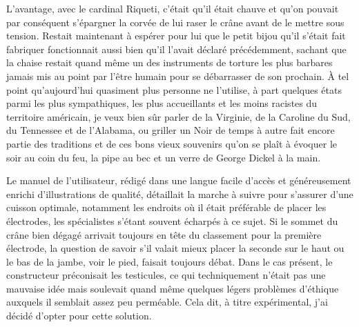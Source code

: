 L’avantage, avec le cardinal Riqueti, c’était qu’il était chauve et qu’on pouvait par conséquent s’épargner la corvée de lui raser le crâne avant de le mettre sous tension. Restait maintenant à espérer pour lui que le petit bijou qu’il s’était fait fabriquer fonctionnait aussi bien qu’il l’avait déclaré précédemment, sachant que la chaise restait quand même un des instruments de torture les plus barbares jamais mis au point par l’être humain pour se débarrasser de son prochain. À tel point qu’aujourd’hui quasiment plus personne ne l’utilise, à part quelques états parmi les plus %
%
%
sympathiques, les plus accueillants et les moins racistes du territoire américain, je veux bien sûr parler de la Virginie, de la Caroline du Sud, du Tennessee et de l’Alabama, ou griller un Noir de temps à autre fait encore partie des traditions et de ces bons vieux souvenirs qu’on se plaît à évoquer le soir au coin du feu, la pipe au bec et un verre de George Dickel à la main.

Le manuel de l’utilisateur, rédigé dans une langue facile d’accès et généreusement enrichi d’illustrations de qualité, détaillait la marche à suivre pour s’assurer d’une cuisson optimale, notamment les endroits où il était préférable de placer les électrodes, les spécialistes s’étant souvent écharpés à ce sujet. Si le sommet du crâne bien dégagé arrivait toujours en tête du classement pour la première électrode, la question de savoir s’il valait mieux placer la seconde sur le haut ou le bas de la jambe, voir le pied, faisait toujours débat. Dans le cas présent, le constructeur préconisait les testicules, ce qui techniquement n’était pas une mauvaise idée mais soulevait quand même quelques légers problèmes d’éthique auxquels il semblait assez peu perméable. Cela dit, à titre expérimental, j’ai décidé d’opter pour cette solution.

